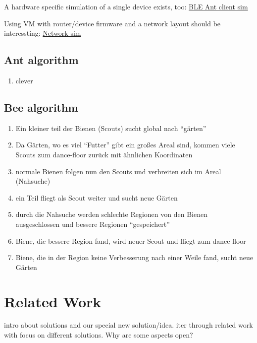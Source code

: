 A hardware specific simulation of a single device exists, too:
\href{https://infocenter.nordicsemi.com/index.jsp?topic=\%2Fcom.nordic.infocenter.sdk52.v0.9.0\%2Fant_examples_ant_fs.html}{BLE
Ant client sim}

Using VM with router/device firmware and a network layout should be
interessting: \href{https://www.gns3.com/community}{Network sim}

\subsection{Ant algorithm}\label{ant-algorithm}

\begin{enumerate}
\def\labelenumi{\arabic{enumi}.}
\tightlist
\item
  clever
\end{enumerate}

\subsection{Bee algorithm}\label{bee-algorithm}

\begin{enumerate}
\def\labelenumi{\arabic{enumi}.}
\tightlist
\item
  Ein kleiner teil der Bienen (Scouts) sucht global nach ``gärten''
\item
  Da Gärten, wo es viel ``Futter'' gibt ein großes Areal sind, kommen
  viele Scouts zum dance-floor zurück mit ähnlichen Koordinaten
\item
  normale Bienen folgen nun den Scouts und verbreiten sich im Areal
  (Nahsuche)
\item
  ein Teil fliegt als Scout weiter und sucht neue Gärten
\item
  durch die Nahsuche werden schlechte Regionen von den Bienen
  ausgeschlossen und bessere Regionen ``gespeichert''
\item
  Biene, die bessere Region fand, wird neuer Scout und fliegt zum dance
  floor
\item
  Biene, die in der Region keine Verbesserung nach einer Weile fand,
  sucht neue Gärten
\end{enumerate}

\section{Related Work}\label{related-work}

intro about solutions and our special new solution/idea. iter through
related work with focus on different solutions. Why are some aspects
open?

